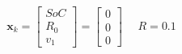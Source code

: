\begin{equation}
 \boldsymbol x_k = 
\begin{bmatrix}
SoC \\
R_0 \\
v_1
\end{bmatrix} = 
\begin{bmatrix}
0\\
0 \\
0
\end{bmatrix}  
\ \ \ \ \ \ R = 0.1
\label{equation:Init2}
\end{equation}



%
% 
%
%
%
%
%
